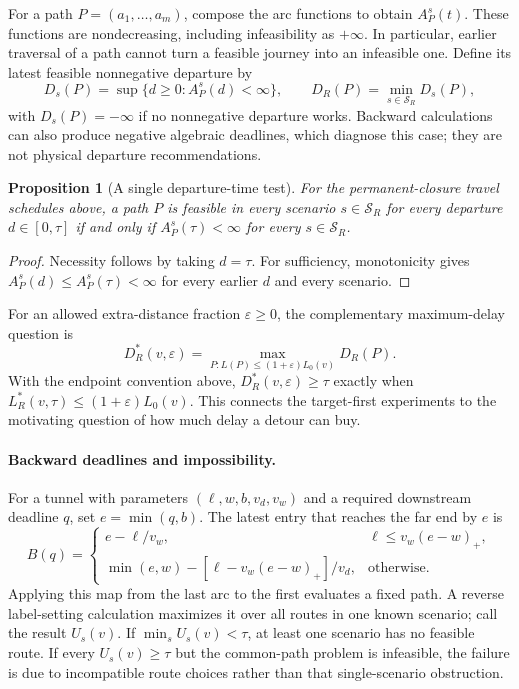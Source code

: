 \documentclass[11pt,a4paper]{article}
\newtheorem{proposition}{Proposition}
\newcommand{\Sc}{\mathcal{S}}
\begin{document}
For a path $P=(a_1,\ldots,a_m)$, compose the arc functions to obtain $A_P^s(t)$. These functions are nondecreasing, including infeasibility as $+\infty$. In particular, earlier traversal of a path cannot turn a feasible journey into an infeasible one. Define its latest feasible nonnegative departure by
\[
 D_s(P)=\sup\{d\ge0:A_P^s(d)<\infty\},\qquad
 D_R(P)=\min_{s\in\Sc_R}D_s(P),
\]
with $D_s(P)=-\infty$ if no nonnegative departure works. Backward calculations can also produce negative algebraic deadlines, which diagnose this case; they are not physical departure recommendations.

\begin{proposition}[A single departure-time test]
For the permanent-closure travel schedules above, a path $P$ is feasible in every scenario $s\in\Sc_R$ for every departure $d\in[0,\tau]$ if and only if $A_P^s(\tau)<\infty$ for every $s\in\Sc_R$.
\end{proposition}
\begin{proof}
Necessity follows by taking $d=\tau$. For sufficiency, monotonicity gives $A_P^s(d)\le A_P^s(\tau)<\infty$ for every earlier $d$ and every scenario.
\end{proof}

For an allowed extra-distance fraction $\varepsilon\ge0$, the complementary maximum-delay question is
\[
 D_R^*(v,\varepsilon)=\max_{P:L(P)\le(1+\varepsilon)L_0(v)}D_R(P).
\]
With the endpoint convention above, $D_R^*(v,\varepsilon)\ge\tau$ exactly when $L_R^*(v,\tau)\le(1+\varepsilon)L_0(v)$. This connects the target-first experiments to the motivating question of how much delay a detour can buy.

\paragraph{Backward deadlines and impossibility.}
For a tunnel with parameters $(\ell,w,b,v_d,v_w)$ and a required downstream deadline $q$, set $e=\min(q,b)$. The latest entry that reaches the far end by $e$ is
\[
 B(q)=\begin{cases}
 e-\ell/v_w,&\ell\le v_w(e-w)_+,\\
 \min(e,w)-[\ell-v_w(e-w)_+]/v_d,&\text{otherwise}.
 \end{cases}
\]
Applying this map from the last arc to the first evaluates a fixed path. A reverse label-setting calculation maximizes it over all routes in one known scenario; call the result $U_s(v)$. If $\min_s U_s(v)<\tau$, at least one scenario has no feasible route. If every $U_s(v)\ge\tau$ but the common-path problem is infeasible, the failure is due to incompatible route choices rather than that single-scenario obstruction.
\end{document}
